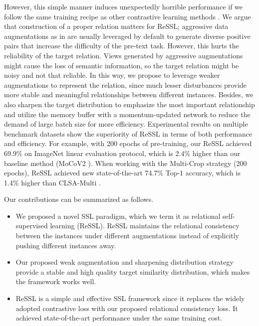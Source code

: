 \documentclass{article}
\newcommand{\<}{\left\langle}
\renewcommand{\>}{\right\rangle}
\begin{document}
However, this simple manner induces unexpectedly horrible performance if we follow the same training recipe as other contrastive learning methods \cite{simclr, moco}. We argue that construction of a proper relation matters for ReSSL; aggressive data augmentations as in \cite{simclr, simclrv2, goodview} are usually leveraged by default to generate diverse positive pairs that increase the difficulty of the pre-text task. However, this hurts the reliability of the target relation. Views generated by aggressive augmentations might cause the loss of semantic information, so the target relation might be noisy and not that reliable. In this way, we propose to leverage weaker augmentations to represent the relation, since much lesser disturbances provide more stable and meaningful relationships between different instances. Besides, we also sharpen the target distribution to emphasize the most important relationship and utilize the memory buffer with a momentum-updated network to reduce the demand of large batch size for more efficiency. Experimental results on multiple benchmark datasets show the superiority of ReSSL in terms of both performance and efficiency. For example, with 200 epochs of pre-training, our ReSSL achieved 69.9\% on ImageNet \cite{imagenet_cvpr09} linear evaluation protocol, which is 2.4\% higher than our baseline method (MoCoV2 \cite{mocov2}). When working with the Multi-Crop strategy (200 epochs), ReSSL achieved new state-of-the-art 74.7\% Top-1 accuracy, which is 1.4\% higher than CLSA-Multi \cite{stronger}.










Our contributions can be summarized as follows.
\begin{itemize}
    \item We proposed a novel SSL paradigm, which we term it as relational self-supervised learning (ReSSL). ReSSL maintains the relational consistency between the instances under different augmentations instead of explicitly pushing different instances away.
    
    \item  Our proposed weak augmentation and sharpening distribution strategy provide a stable and high quality target similarity distribution, which makes the framework works well.
    
    \item  ReSSL is a simple and effective SSL framework since it replaces the widely adopted contrastive loss with our proposed relational consistency loss. It achieved state-of-the-art performance under the same training cost.
\end{itemize}
\end{document}
